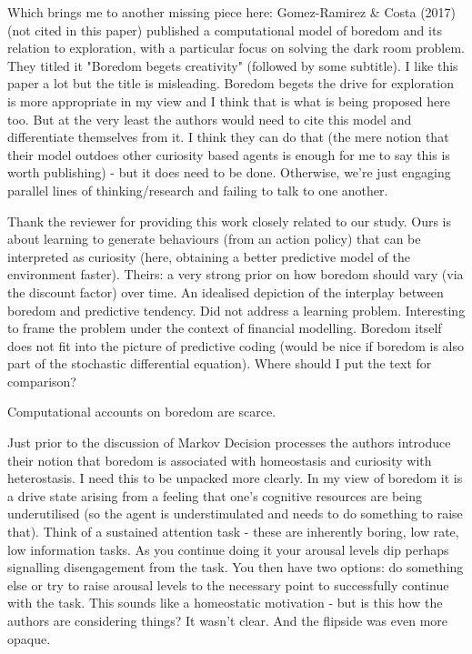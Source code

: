 \documentclass[utf8]{article}
\newenvironment{reply}  
    {\color{Blue}\noindent\newline}
    {\newline}
\begin{document}
        Which brings me to another missing piece here: Gomez-Ramirez \& Costa  (2017) (not cited in this paper) published a computational model of boredom and its relation to exploration, with a particular focus on solving the dark room problem. They titled it "Boredom begets creativity" (followed by some subtitle). I like this paper a lot but the title is misleading. Boredom begets the drive for exploration is more appropriate in my view and I think that is what is being proposed here too. But at the very least the authors would need to cite this model and differentiate themselves from it. I think they can do that (the mere notion that their model outdoes other curiosity based agents is enough for me to say this is worth publishing) - but it does need to be done. Otherwise, we're just engaging parallel lines of thinking/research and failing to talk to one another. 
        
        \begin{reply}
            Thank the reviewer for providing this work closely related to our study.
            Ours is about learning to generate behaviours (from an action policy) that can be interpreted as curiosity (here, obtaining a better predictive model of the environment faster).
            Theirs: a very strong prior on how boredom should vary (via the discount factor) over time. An idealised depiction of the interplay between boredom and predictive tendency. Did not address a learning problem. Interesting to frame the problem under the context of financial modelling. Boredom itself does not fit into the picture of predictive coding (would be nice if boredom is also part of the stochastic differential equation).
            Where should I put the text for comparison?
            
            Computational accounts on boredom are scarce.
            \newline
        \end{reply}
        
        Just prior to the discussion of Markov Decision processes the authors introduce their notion that boredom is associated with homeostasis and curiosity with heterostasis. I need this to be unpacked more clearly. In my view of boredom it is a drive state arising from a feeling that one's cognitive resources are being underutilised (so the agent is understimulated and needs to do something to raise that). Think of a sustained attention task - these are inherently boring, low rate, low information tasks. As you continue doing it your arousal levels dip perhaps signalling disengagement from the task. You then have two options: do something else or try to raise arousal levels to the necessary point to successfully continue with the task. This sounds like a homeostatic motivation - but is this how the authors are considering things? It wasn't clear. And the flipside was even more opaque. 
        
\end{document}
